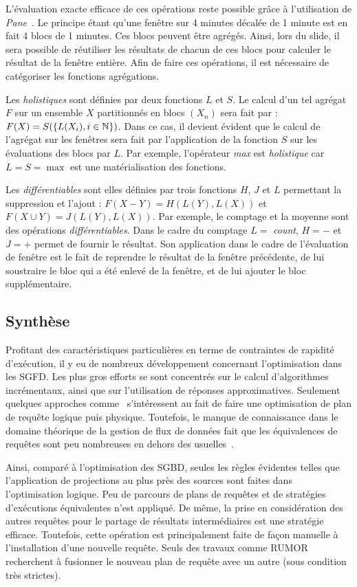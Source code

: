 L'évaluation exacte efficace de ces opérations reste possible grâce à l'utilisation de \textit{Pane}~\cite{Li:pane}. Le principe étant qu'une fenêtre sur 4 minutes décalée de 1 minute est en fait 4 blocs de 1 minutes. Ces blocs peuvent être agrégés. Ainsi, lors du slide, il sera possible de réutiliser les résultats de chacun de ces blocs pour calculer le résultat de la fenêtre entière. Afin de faire ces opérations, il est nécessaire de catégoriser les fonctions agrégations. 

Les \textit{holistiques} sont définies par deux fonctions $L$ et $S$. Le calcul d'un tel agrégat $F$ sur un ensemble $X$ partitionnés en blocs $(X_n)$ sera fait par : $F(X) = S(\{L(X_i), i\in \mathbb{N}\})$. Dans ce cas, il devient évident que le calcul de l'agrégat sur les fenêtres sera fait par l'application de la fonction $S$ sur les évaluations des blocs par $L$. Par exemple, l'opérateur \textit{max} est \textit{holistique} car $L=S=\max$ est une matérialisation des fonctions. 

Les \textit{différentiables} sont elles définies par trois fonctions $H$, $J$ et $L$ permettant la suppression et l'ajout : $F(X-Y) = H(L(Y), L(X))$ et $F(X\cup Y) = J(L(Y), L(X))$. Par exemple, le comptage et la moyenne sont des opérations \textit{différentiables}. Dans le cadre du comptage $L=$ \textit{count}, $H=-$ et $J=+$ permet de fournir le résultat. Son application dans le cadre de l'évaluation de fenêtre est le fait de reprendre le résultat de la fenêtre précédente, de lui soustraire le bloc qui a été enlevé de la fenêtre, et de lui ajouter le bloc supplémentaire.

\subsection{Synthèse}
Profitant des caractéristiques particulières en terme de contraintes de rapidité d'exécution, il y eu de nombreux développement concernant l'optimisation dans les SGFD. Les plus gros efforts se sont concentrés sur le calcul d'algorithmes incrémentaux, ainsi que sur l'utilisation de réponses approximatives. Seulement quelques approches comme~\cite{Galpin:snee,Kramer:semantics} s'intéressent au fait de faire une optimisation de plan de requête logique puis physique. Toutefois, le manque de connaissance dans le domaine théorique de la gestion de flux de données fait que les équivalences de requêtes sont peu nombreuses en dehors des usuelles~\cite{Slivinskas:temporal,Arasu:stream}.

Ainsi, comparé à l'optimisation des SGBD, seules les règles évidentes telles que l'application de projections au plus près des sources sont faites dans l'optimisation logique. Peu de parcours de plans de requêtes et de stratégies d'exécutions équivalentes n'est appliqué. De même, la prise en considération des autres requêtes pour le partage de résultats intermédiaires est une stratégie efficace. Toutefois, cette opération est principalement faite de façon manuelle à l'installation d'une nouvelle requête. Seuls des travaux comme RUMOR~\cite{Hong:mqo} recherchent à fusionner le nouveau plan de requête avec un autre (sous condition très strictes).

